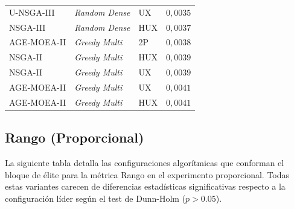 \begin{longtable}{lllc}
U-NSGA-III & \textit{Random Dense} & UX & $0{,}0035$ \\
NSGA-III & \textit{Random Dense} & HUX & $0{,}0037$ \\
AGE-MOEA-II & \textit{Greedy Multi} & 2P & $0{,}0038$ \\
NSGA-II & \textit{Greedy Multi} & HUX & $0{,}0039$ \\
NSGA-II & \textit{Greedy Multi} & UX & $0{,}0039$ \\
AGE-MOEA-II & \textit{Greedy Multi} & UX & $0{,}0041$ \\
AGE-MOEA-II & \textit{Greedy Multi} & HUX & $0{,}0041$ \\
\end{longtable}

\subsection{Rango (Proporcional)}\label{anexo:elite_range_prop}

La siguiente tabla detalla las configuraciones algorítmicas que conforman el bloque de élite para la métrica Rango en el experimento proporcional. Todas estas variantes carecen de diferencias estadísticas significativas respecto a la configuración líder según el test de Dunn-Holm ($p > 0.05$).

